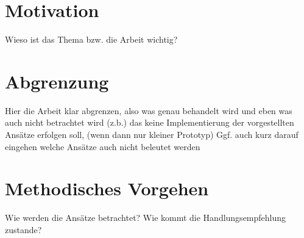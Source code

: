 \section{Motivation}

Wieso ist das Thema bzw. die Arbeit wichtig?

\section{Abgrenzung}

Hier die Arbeit klar abgrenzen, also was genau behandelt wird und eben was auch nicht betrachtet wird (z.b.) das keine Implementierung der vorgestellten Ansätze erfolgen soll, (wenn dann nur kleiner Prototyp)
Ggf. auch kurz darauf eingehen welche Ansätze auch nicht beleutet werden

\section{Methodisches Vorgehen}

Wie werden die Ansätze betrachtet? Wie kommt die Handlungsempfehlung zustande?